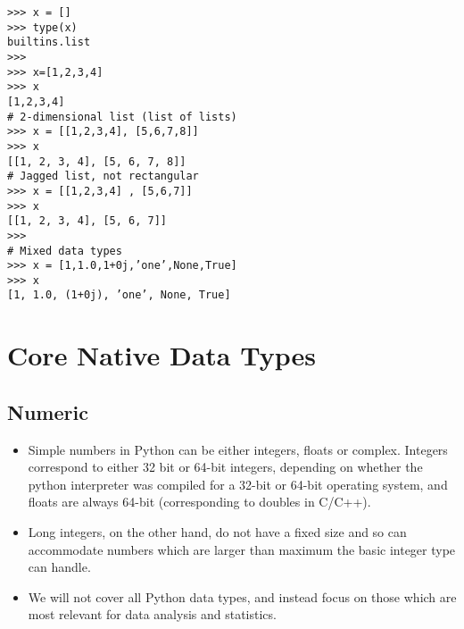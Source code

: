 \documentclass[Pydata.tex]{subfiles}
\begin{document}
\begin{framed}
\begin{verbatim}
>>> x = []
>>> type(x)
builtins.list
>>>
>>> x=[1,2,3,4]
>>> x
[1,2,3,4]
# 2-dimensional list (list of lists)
>>> x = [[1,2,3,4], [5,6,7,8]]
>>> x
[[1, 2, 3, 4], [5, 6, 7, 8]]
# Jagged list, not rectangular
>>> x = [[1,2,3,4] , [5,6,7]]
>>> x
[[1, 2, 3, 4], [5, 6, 7]]
>>>
# Mixed data types
>>> x = [1,1.0,1+0j,’one’,None,True]
>>> x
[1, 1.0, (1+0j), ’one’, None, True]

\end{verbatim}
\end{framed}

\newpage

\section{Core Native Data Types}
\subsection{ Numeric}
\begin{itemize}
\item Simple numbers in Python can be either integers, floats or complex. Integers correspond to either 32
bit or 64-bit integers, depending on whether the python interpreter was compiled for a 32-bit or 64-bit
operating system, and floats are always 64-bit (corresponding to doubles in C/C++). 

\item Long integers, on the
other hand, do not have a fixed size and so can accommodate numbers which are larger than maximum
the basic integer type can handle. 

\item We will not cover all Python data types, and instead focus
on those which are most relevant for data analysis and statistics. 
\end{itemize}
\end{document}
